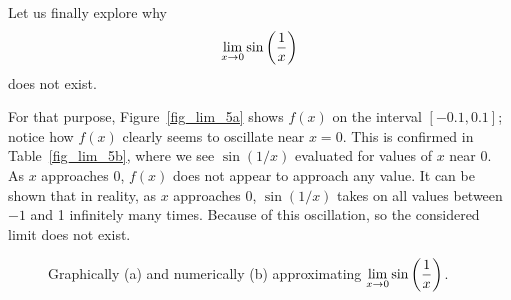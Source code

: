 \begin{example}
Let us finally explore why 
$$\displaystyle\lim_{x\to 0}\sin\left(\dfrac{1}{x}\right)$$
does not exist.


For that purpose, Figure~\ref{fig_lim_5a} shows $f(x)$ on the interval $[-0.1,0.1]$; notice how $f(x)$ clearly seems to oscillate near $x=0$.   This is confirmed in Table~\ref{fig_lim_5b}, where we see $\sin(1/x)$ evaluated for values of $x$ near 0. As $x$ approaches 0, $f(x)$ does not appear to approach any value. It can be shown that in reality, as $x$ approaches 0, $\sin(1/x)$ takes on all values between $-1$ and 1 infinitely many times. Because of this oscillation, so the considered limit does not exist.





\begin{figure}[H]
  \centering
  \qquad
\caption{Graphically (a) and numerically (b) approximating $\displaystyle\lim_{x\to 0} \sin\left(\frac{1}{x}\right)$.}
\end{figure}

\end{example}

\ifcourse
